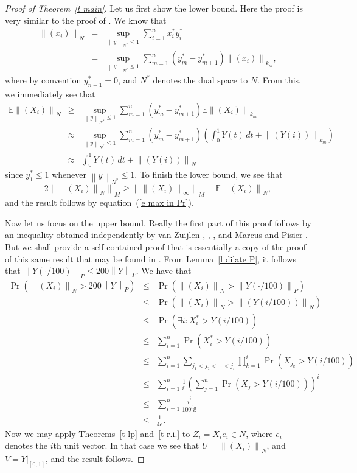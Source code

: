\documentclass[12pt]{amsart}
\newcommand{\E}{{\mathbb E}}
\newcommand{\normo}[1]{{\left\|#1\right\|}}
\newcommand{\snormo}[1]{{\mathopen\|#1\mathclose\|}}
\begin{document}
\begin{proof}[Proof of Theorem~\ref{t main}]
Let us first show the lower bound.  Here the proof is very similar
to the proof of \cite[Theorem 27]{montgomery-smith-semenov}.
We know that
\begin{eqnarray*}
   \snormo{(x_i)}_N
   &=&
   \sup_{\snormo y_{N^*} \le 1}
   \sum_{i=1}^n x_i^* y_i^*  \\
   &=&
   \sup_{\normo y_{N^*} \le 1}
   \sum_{m=1}^n (y_m^*-y_{m+1}^*) \snormo{(x_i)}_{k_m} ,
\end{eqnarray*}
where by convention $y^*_{n+1} = 0$, and $N^*$ denotes the dual space
to $N$.  From this, we immediately see
that
\begin{eqnarray*}
   \E \snormo{(X_i)}_N
   &\ge& 
   \sup_{\normo y_{N^*} \le 1}
   \sum_{m=1}^n (y_m^*-y_{m+1}^*)
   \E\snormo{(X_i)}_{k_m} \\
   &\approx&
   \sup_{\normo y_{N^*} \le 1}
   \sum_{m=1}^n (y_m^*-y_{m+1}^*)
   \left(
   \int_0^1 Y(t) \, dt
   +
   \snormo{(Y(i))}_{k_m}
   \right)  \\
   &\approx&
   \int_0^1 Y(t) \, dt
   +
   \snormo{(Y(i))}_N 
\end{eqnarray*}
since $y_1^* \le 1$ whenever $\normo y_{N^*} \le 1$.
To finish the lower bound, we see that
\[ 2\snormo{ \snormo{(X_i)}_N }_M
   \ge \snormo{\snormo{(X_i)}_\infty}_M + \E \snormo{(X_i)}_N , \]
and the result follows by equation~(\ref{e max in Pr}).

Now let us focus on the upper bound.  Really the first part of this proof
follows by an inequality obtained independently by van Zuijlen 
\cite{van zuijlen 1}, \cite{van zuijlen 2}, \cite{van zuijlen 3},
and Marcus and Pisier \cite{marcus-pisier}.  But we
shall provide a self contained proof that is essentially a copy of 
the proof of this same result that may be found in
\cite[Theorem 5.1]{marcus-zinn}.  From Lemma~\ref{l dilate P},
it follows that $ \normo{Y(\cdot/100)}_P \le 200 \normo Y_P$.
We have that
\begin{eqnarray*}
   \Pr( \snormo{(X_i)}_N > 200 \normo Y_P )
   &\le&
   \Pr( \snormo{(X_i)}_N > \normo{Y(\cdot/100)}_P ) \\
   &\le&
   \Pr( \snormo{(X_i)}_N > \normo{(Y(i/100))}_N ) \\
   &\le&
   \Pr( \exists i : X_i^* > Y(i/100) ) \\
   &\le&
   \sum_{i=1}^n
   \Pr( X_i^* > Y(i/100) ) \\
   &\le&
   \sum_{i=1}^n
   \sum_{j_1<j_2<\cdots<j_i}
   \prod_{k=1}^i \Pr( X_{j_k} > Y(i/100) ) \\
   &\le&
   \sum_{i=1}^n
   \frac1{i!} \left(\sum_{j=1}^n \Pr(X_j > Y(i/100))\right)^i \\
   &\le&
   \sum_{i=1}^n
   \frac{i^i}{100^i i!} \\
   &\le&
   \frac1{4e} .
\end{eqnarray*}
Now we may apply Theorems~\ref{t lp} and~\ref{t r.i.} to 
$Z_i = X_i e_i \in N$, where $e_i$ denotes the $i$th unit vector.
In that case we see that $U = \snormo{(X_i)}_N$, and $V = Y|_{[0,1]}$,
and the result follows.
\end{proof}
\end{document}

